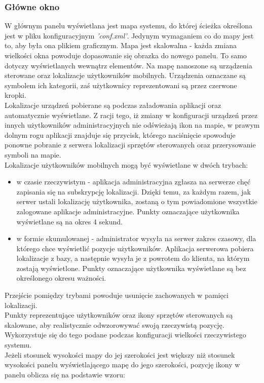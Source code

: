 \subsubsection{Główne okno}
W głównym panelu wyświetlana jest mapa systemu, do której ścieżka określona jest w pliku konfiguracyjnym \textit{'conf.xml'}. Jedynym wymaganiem co do mapy jest to, aby była ona plikiem graficznym. Mapa jest skalowalna - każda zmiana wielkości okna powoduje dopasowanie się obrazka do nowego panelu. To samo dotyczy wyświetlanych wewnątrz elementów. Na mapę nanoszone są urządzenia sterowane oraz lokalizacje użytkowników mobilnych. Urządzenia oznaczane są symbolem ich kategorii, zaś użytkownicy reprezentowani są przez czerwone kropki.\\
Lokalizacje urządzeń pobierane są podczas załadowania aplikacji oraz automatycznie wyświetlane. Z racji tego, iż zmiany w konfiguracji urządzeń przez innych użytkowników administracyjnych nie odświeżają ikon na mapie, w prawym dolnym rogu aplikacji znajduje się przycisk, którego naciśnięcie spowoduje ponowne pobranie z serwera lokalizacji sprzętów sterowanych oraz przerysowanie symboli na mapie.\\
Lokalizacje użytkowników mobilnych mogą być wyświetlane w dwóch trybach:
\begin{itemize}
	\item w czasie rzeczywistym - aplikacja administracyjna zgłasza na serwerze chęć zapisania się na subskrypcję lokalizacji. Dzięki temu, za każdym razem, jak serwer ustali lokalizację użytkownika, zostaną o tym powiadomione wszystkie zalogowane aplikacje administracyjne. Punkty oznaczające użytkownika wyświetlane są na okres 4 sekund.
	\item w formie skumulowanej - administrator wysyła na serwer zakres czasowy, dla którego chce wyświetlić pozycje użytkowników. Aplikacja serwerowa pobiera lokalizacje z bazy, a następnie wysyła je z powrotem do klienta, na którym zostają wyświetlone. Punkty oznaczające użytkownika wyświetlane są bez określonego okresu ważności.
\end{itemize}
Przejście pomiędzy trybami powoduje usunięcie zachowanych w pamięci lokalizacji.\\
Punkty reprezentujące użytkowników oraz ikony sprzętów sterowanych są skalowane, aby realistycznie odwzorowywać swoją rzeczywistą pozycję. Wykorzystuje się do tego podane podczas konfiguracji wielkości rzeczywistego systemu.\\
Jeżeli stosunek wysokości mapy do jej szerokości jest większy niż stosunek wysokości panelu wyświetlającego mapę do jego szerokości, pozycję ikony w panelu oblicza się na podstawie wzoru:
